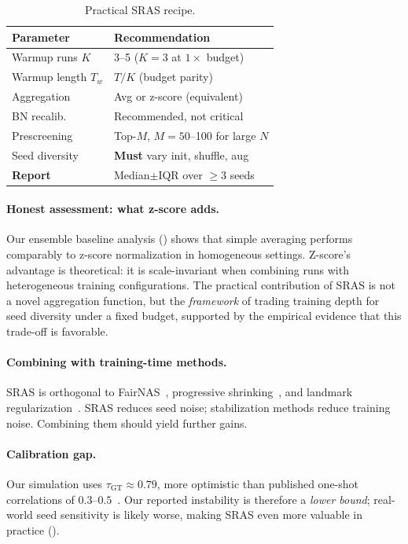 \documentclass[10pt,twocolumn,letterpaper]{article}
\newcommand{\method}{SRAS}
\newcommand{\taugt}{\ensuremath{\tau_{\text{GT}}}}
\begin{document}
\begin{table}[t]
\centering
\caption{Practical \method{} recipe.}
\label{tab:recipe}
\small
\begin{tabular}{@{}lp{4.2cm}@{}}
\toprule
\textbf{Parameter} & \textbf{Recommendation} \\
\midrule
Warmup runs $K$ & 3--5 ($K{=}3$ at $1{\times}$ budget) \\
Warmup length $T_w$ & $T / K$ (budget parity) \\
Aggregation & Avg or z-score (equivalent) \\
BN recalib.\ & Recommended, not critical \\
Prescreening & Top-$M$, $M{=}50$--100 for large $N$ \\
Seed diversity & \textbf{Must} vary init, shuffle, aug \\
\midrule
\textbf{Report} & Median$\pm$IQR over ${\geq}3$ seeds \\
\bottomrule
\end{tabular}
\end{table}

\paragraph{Honest assessment: what z-score adds.}
Our ensemble baseline analysis () shows that simple averaging performs comparably to z-score normalization in homogeneous settings. Z-score's advantage is theoretical: it is scale-invariant when combining runs with heterogeneous training configurations. The practical contribution of \method{} is not a novel aggregation function, but the \textit{framework} of trading training depth for seed diversity under a fixed budget, supported by the empirical evidence that this trade-off is favorable.

\paragraph{Combining with training-time methods.}
\method{} is orthogonal to FairNAS~\cite{chu2021fairnas}, progressive shrinking~\cite{cai2020ofa}, and landmark regularization~\cite{yu2021landmark}. \method{} reduces seed noise; stabilization methods reduce training noise. Combining them should yield further gains.

\paragraph{Calibration gap.}
Our simulation uses $\taugt \approx 0.79$, more optimistic than published one-shot correlations of $0.3$--$0.5$~\cite{yu2020evaluating}. Our reported instability is therefore a \textit{lower bound}; real-world seed sensitivity is likely worse, making \method{} even more valuable in practice ().
\end{document}
